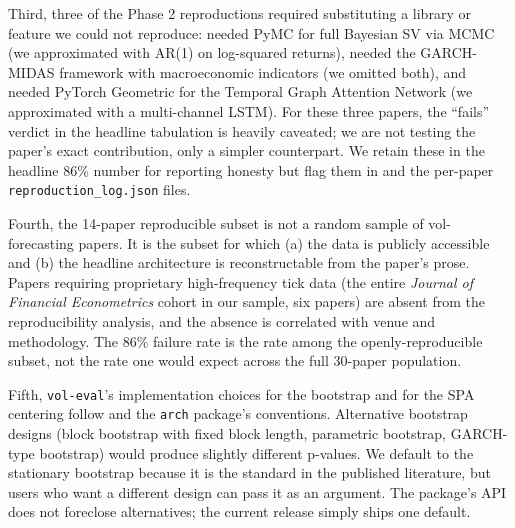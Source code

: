Third, three of the Phase 2 reproductions required substituting a library or feature we could not reproduce: \citet{Kim2021} needed PyMC for full Bayesian SV via MCMC (we approximated with AR(1) on log-squared returns), \citet{ErsinBildirici2023} needed the GARCH-MIDAS framework with macroeconomic indicators (we omitted both), and \citet{Kumar2024} needed PyTorch Geometric for the Temporal Graph Attention Network (we approximated with a multi-channel LSTM). For these three papers, the ``fails'' verdict in the headline tabulation is heavily caveated; we are not testing the paper's exact contribution, only a simpler counterpart. We retain these in the headline 86\% number for reporting honesty but flag them in  and the per-paper \texttt{reproduction\_log.json} files.

Fourth, the 14-paper reproducible subset is not a random sample of vol-forecasting papers. It is the subset for which (a) the data is publicly accessible and (b) the headline architecture is reconstructable from the paper's prose. Papers requiring proprietary high-frequency tick data (the entire \emph{Journal of Financial Econometrics} cohort in our sample, six papers) are absent from the reproducibility analysis, and the absence is correlated with venue and methodology. The 86\% failure rate is the rate among the openly-reproducible subset, not the rate one would expect across the full 30-paper population.

Fifth, \texttt{vol-eval}'s implementation choices for the bootstrap and for the SPA centering follow \citet{Hansen2005} and the \texttt{arch} package's conventions. Alternative bootstrap designs (block bootstrap with fixed block length, parametric bootstrap, GARCH-type bootstrap) would produce slightly different p-values. We default to the stationary bootstrap because it is the standard in the published literature, but users who want a different design can pass it as an argument. The package's API does not foreclose alternatives; the current release simply ships one default.
